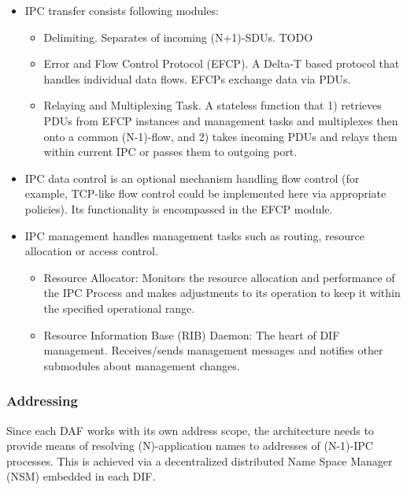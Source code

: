                 \begin{itemize}
                    \item IPC transfer consists following modules:
                    \begin{itemize}
                        \item Delimiting. Separates of incoming (N+1)-SDUs. TODO
                        \item Error and Flow Control Protocol (EFCP). A Delta-T \cite{deltat} based protocol that handles individual data flows. EFCPs exchange data via PDUs.
                        \item Relaying and Multiplexing Task. A stateless function that 1) retrieves PDUs from EFCP instances and management tasks and multiplexes then onto a common (N-1)-flow, and 2) takes incoming PDUs and relays them within current IPC or passes them to outgoing port.
                    \end{itemize}
                    \item IPC data control is an optional mechanism handling flow control (for example, TCP-like flow control could be implemented here via appropriate policies). Its functionality is encompassed in the EFCP module.
                    \item IPC management handles management tasks such as routing, resource allocation or access control.
                    \begin{itemize}
                        \item Resource Allocator: Monitors the resource allocation and performance of the IPC Process and makes adjustments to its operation to keep it within the specified operational range.
                        \item Resource Information Base (RIB) Daemon: The heart of DIF management. Receives/sends management messages and notifies other submodules about management changes.
                    \end{itemize}
                \end{itemize}


            \subsubsection{Addressing}

                Since each DAF works with its own address scope, the architecture needs to provide means of resolving (N)-application names to addresses of (N-1)-IPC processes. This is achieved via a decentralized distributed Name Space Manager (NSM) embedded in each DIF.

